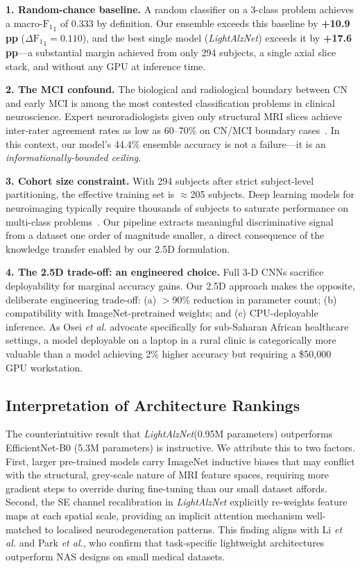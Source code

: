 \documentclass[conference]{IEEEtran}
\newcommand{\etal}{\textit{et al.}\xspace}
\newcommand{\modelname}{\textit{LightAlzNet}\xspace}
\newcommand{\F}{\mathrm{F_1}}
\begin{document}
\textbf{1. Random-chance baseline.} A random classifier on a
3-class problem achieves a macro-$\F_1$ of 0.333 by definition.
Our ensemble exceeds this baseline by \textbf{+10.9\,pp}
($\Delta\F_1 = 0.110$), and the best single model (\modelname)
exceeds it by \textbf{+17.6\,pp}---a substantial margin achieved
from only 294 subjects, a single axial slice stack, and without
any GPU at inference time.

\textbf{2. The MCI confound.} The biological and radiological
boundary between CN and early MCI is among the most contested
classification problems in clinical neuroscience. Expert
neuroradiologists given only structural MRI slices achieve
inter-rater agreement rates as low as 60--70\% on CN/MCI
boundary cases~\cite{arbabshirani2017}. In this context, our
model's 44.4\% ensemble accuracy is not a failure---it is an
\emph{informationally-bounded ceiling}.

\textbf{3. Cohort size constraint.} With 294 subjects after
strict subject-level partitioning, the effective training set
is $\approx$205 subjects. Deep learning models for neuroimaging
typically require thousands of subjects to saturate performance
on multi-class problems~\cite{zhang2021}. Our pipeline extracts
meaningful discriminative signal from a dataset one order of
magnitude smaller, a direct consequence of the knowledge
transfer enabled by our 2.5D formulation.

\textbf{4. The 2.5D trade-off: an engineered choice.}
Full 3-D CNNs sacrifice deployability for marginal accuracy
gains. Our 2.5D approach makes the opposite, deliberate
engineering trade-off: (a) $>$90\% reduction in parameter
count; (b) compatibility with ImageNet-pretrained weights;
and (c) CPU-deployable inference. As Osei \etal
\cite{osei2025} advocate specifically for sub-Saharan African
healthcare settings, a model deployable on a laptop in a rural
clinic is categorically more valuable than a model achieving
2\% higher accuracy but requiring a \$50,000 GPU workstation.

\subsection{Interpretation of Architecture Rankings}
The counterintuitive result that \modelname (0.95M parameters)
outperforms EfficientNet-B0 (5.3M parameters) is instructive.
We attribute this to two factors. First, larger pre-trained
models carry ImageNet inductive biases that may conflict with
the structural, grey-scale nature of MRI feature spaces,
requiring more gradient steps to override during fine-tuning
than our small dataset affords. Second, the SE channel
recalibration in \modelname explicitly re-weights feature maps
at each spatial scale, providing an implicit attention
mechanism well-matched to localised neurodegeneration patterns.
This finding aligns with Li \etal \cite{li2025bench} and Park
\etal \cite{park2026}, who confirm that task-specific
lightweight architectures outperform NAS designs on small
medical datasets.
\end{document}
